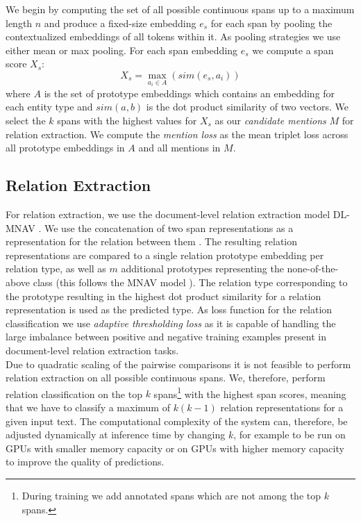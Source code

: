 \documentclass[11pt]{article}
\begin{document}
We begin by computing the set of all possible continuous spans up to a maximum length $n$ and produce a fixed-size embedding $e_{s}$ for each span by pooling the contextualized embeddings of all tokens within it.
As pooling strategies we use either mean or max pooling.
For each span embedding $e_{s}$ we compute a span score $X_{s}$:
\begin{equation}
    X_{s} = \max_{a_{i} \in A} (sim(e_{s}, a_{i}))
\end{equation}
where $A$ is the set of prototype embeddings which contains an embedding for each entity type and $sim(a,b)$ is the dot product similarity of two vectors.
We select the $k$ spans with the highest values for $X_{s}$ as our \textit{candidate mentions} $M$ for relation extraction. 
We compute the \textit{mention loss} as the mean triplet loss \cite{DBLP:conf/cvpr/SchroffKP15} across all prototype embeddings in $A$ and all mentions in $M$.

\subsection{Relation Extraction}

For relation extraction, we use the document-level relation extraction model DL-MNAV \cite{popovic_fsdlre_2022}. 
We use the concatenation of two span representations as a representation for the relation between them \cite{wang_extracting_2019}.
The resulting relation representations are compared to a single relation prototype embedding per relation type, as well as $m$ additional prototypes representing the none-of-the-above class (this follows the MNAV model \cite{sabo_revisiting_2021}).
The relation type corresponding to the prototype resulting in the highest dot product similarity for a relation representation is used as the predicted type.
As loss function for the relation classification we use \textit{adaptive thresholding loss} \cite{zhou_document-level_2020} as it is capable of handling the large imbalance between positive and negative training examples present in document-level relation extraction tasks.\\

Due to quadratic scaling of the pairwise comparisons it is not feasible to perform relation extraction on all possible continuous spans.
We, therefore, perform relation classification on the top $k$ spans\footnote{During training we add annotated spans which are not among the top $k$ spans.} with the highest span scores, meaning that we have to classify a maximum of $k(k-1)$ relation representations for a given input text.
The computational complexity of the system can, therefore, be adjusted dynamically at inference time by changing $k$, for example to be run on GPUs with smaller memory capacity or on GPUs with higher memory capacity to improve the quality of predictions. \\
\end{document}
